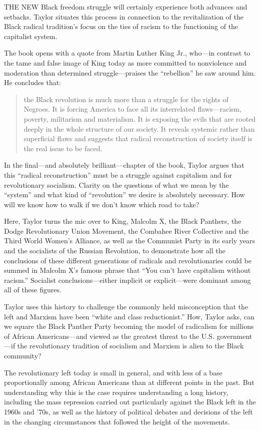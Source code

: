 \sectiondivider

THE NEW Black freedom struggle will certainly experience both advances and setbacks. Taylor situates this process in connection to the revitalization of the Black radical tradition's focus on the ties of racism to the functioning of the capitalist system.

The book opens with a quote from Martin Luther King Jr., who---in contrast to the tame and false image of King today as more committed to nonviolence and moderation than determined struggle---praises the ``rebellion'' he saw around him. He concludes that:

\blockquote{the Black revolution is much more than a struggle for the rights of Negroes. It is forcing America to face all its interrelated flaws---racism, poverty, militarism and materialism. It is exposing the evils that are rooted deeply in the whole structure of our society. It reveals systemic rather than superficial flaws and suggests that radical reconstruction of society itself is the real issue to be faced.}

In the final---and absolutely brilliant---chapter of the book, Taylor argues that this ``radical reconstruction'' must be a struggle against capitalism and for revolutionary socialism. Clarity on the questions of what we mean by the ``system'' and what kind of ``revolution'' we desire is absolutely necessary. How will we know how to walk if we don't know which road to take?

Here, Taylor turns the mic over to King, Malcolm X, the Black Panthers, the Dodge Revolutionary Union Movement, the Combahee River Collective and the Third World Women's Alliance, as well as the Communist Party in its early years and the socialists of the Russian Revolution, to demonstrate how all the conclusions of these different generations of radicals and revolutionaries could be summed in Malcolm X's famous phrase that ``You can't have capitalism without racism.'' Socialist conclusions---either implicit or explicit---were dominant among all of these figures.

Taylor uses this history to challenge the commonly held misconception that the left and Marxism have been ``white and class reductionist.'' How, Taylor asks, can we square the Black Panther Party becoming the model of radicalism for millions of African Americans---and viewed as the greatest threat to the U.S. government---if the revolutionary tradition of socialism and Marxism is alien to the Black community?

The revolutionary left today is small in general, and with less of a base proportionally among African Americans than at different points in the past. But understanding why this is the case requires understanding a long history, including the mass repression carried out particularly against the Black left in the 1960s and '70s, as well as the history of political debates and decisions of the left in the changing circumstances that followed the height of the movements.

